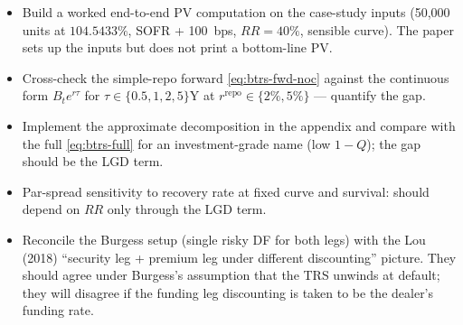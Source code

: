 \documentclass[11pt,a4paper]{article}
\begin{document}
\begin{todobox}
\begin{itemize}[noitemsep]
  \item Build a worked end-to-end PV computation on the case-study
        inputs (50,000 units at $104.5433\%$, SOFR + 100~bps, $RR =
        40\%$, sensible curve). The paper sets up the inputs but
        does not print a bottom-line PV.
  \item Cross-check the simple-repo forward \eqref{eq:btrs-fwd-noc}
        against the continuous form $B_t e^{r\tau}$ for $\tau \in
        \{0.5, 1, 2, 5\}$Y at $r^{\text{repo}} \in \{2\%, 5\%\}$ ---
        quantify the gap.
  \item Implement the approximate decomposition in the appendix and
        compare with the full \eqref{eq:btrs-full} for an
        investment-grade name (low $1 - Q$); the gap should be the
        LGD term.
  \item Par-spread sensitivity to recovery rate at fixed curve and
        survival: should depend on $RR$ only through the LGD term.
  \item Reconcile the Burgess setup (single risky DF for both legs)
        with the Lou (2018) ``security leg + premium leg under
        different discounting'' picture. They should agree under
        Burgess's assumption that the TRS unwinds at default; they
        will disagree if the funding leg discounting is taken to be
        the dealer's funding rate.
\end{itemize}
\end{todobox}
\end{document}
